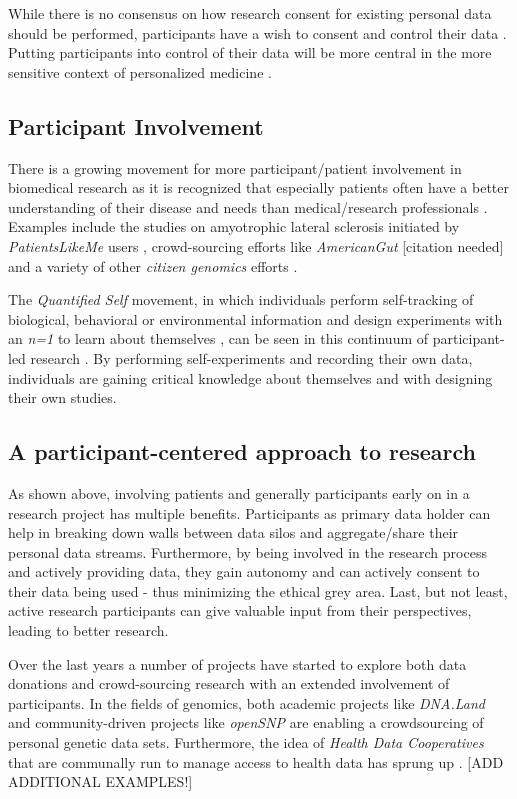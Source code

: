 \documentclass[a4paper,num-refs]{oup-contemporary}
\begin{document}
While there is no consensus on how research consent for existing personal data should be performed, participants have a wish to consent and control their data \cite{Golder2017}. Putting participants into control of their data will be more central in the more sensitive context of personalized medicine \cite{Kossmann2014}.


\subsection{Participant Involvement}
There is a growing movement for more participant/patient involvement in biomedical research as it is recognized that especially patients often have a better understanding of their disease and needs than medical/research professionals \cite{Mader2018, Vayena2015}. Examples include the studies on amyotrophic lateral sclerosis initiated by \textit{PatientsLikeMe} users \cite{Wicks2011}, crowd-sourcing efforts like \textit{AmericanGut} [citation needed] and a variety of other \textit{citizen genomics} efforts \cite{McGowan2017}.

The \textit{Quantified Self} movement, in which individuals perform self-tracking of biological, behavioral or environmental information and design experiments with an \textit{n=1} to learn about themselves \cite{Swan2013}, can be seen in this continuum of participant-led research \cite{Swan2012}. By performing self-experiments and recording their own data, individuals are gaining critical knowledge about themselves and with designing their own studies.

\subsection{A participant-centered approach to research}
As shown above, involving patients and generally participants early on in a research project has multiple benefits. Participants as primary data holder can help in breaking down walls between data silos and aggregate/share their personal data streams. Furthermore, by being involved in the research process and actively providing data, they gain autonomy and can actively consent to their data being used - thus minimizing the ethical grey area. Last, but not least, active research participants can give valuable input from their perspectives, leading to better research.

Over the last years a number of projects have started to explore both data donations and crowd-sourcing research with an extended involvement of participants. In the fields of genomics, both academic projects like \textit{DNA.Land} \cite{Yuan2018} and community-driven projects like \textit{openSNP} \cite{Greshake2014} are enabling a crowdsourcing of personal genetic data sets. Furthermore, the idea of \textit{Health Data Cooperatives} that are communally run to manage access to health data has sprung up \cite{Kossmann2014}. [ADD ADDITIONAL EXAMPLES!] 
\end{document}
